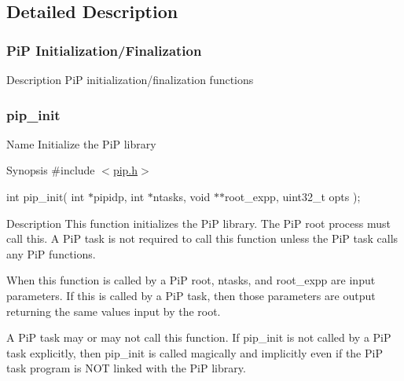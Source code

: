 \subsection{Detailed Description}
\hypertarget{pip-intialize-finalize}{}\subsubsection{Pi\-P Initialization/\-Finalization}\label{pip-intialize-finalize}
\begin{DoxyParagraph}{Description}
Pi\-P initialization/finalization functions 
\end{DoxyParagraph}
\hypertarget{pip_init}{}\subsubsection{pip\-\_\-init}\label{pip_init}
\begin{DoxyParagraph}{Name}
Initialize the Pi\-P library
\end{DoxyParagraph}
\begin{DoxyParagraph}{Synopsis}
\#include $<$\hyperlink{pip_8h_source}{pip.\-h}$>$ \par
int pip\-\_\-init( int $\ast$pipidp, int $\ast$ntasks, void $\ast$$\ast$root\-\_\-expp, uint32\-\_\-t opts );
\end{DoxyParagraph}
\begin{DoxyParagraph}{Description}
This function initializes the Pi\-P library. The Pi\-P root process must call this. A Pi\-P task is not required to call this function unless the Pi\-P task calls any Pi\-P functions. 
\end{DoxyParagraph}
\begin{DoxyParagraph}{}
When this function is called by a Pi\-P root, {\ttfamily ntasks}, and {\ttfamily root\-\_\-expp} are input parameters. If this is called by a Pi\-P task, then those parameters are output returning the same values input by the root. 
\end{DoxyParagraph}
\begin{DoxyParagraph}{}
A Pi\-P task may or may not call this function. If {\ttfamily pip\-\_\-init} is not called by a Pi\-P task explicitly, then {\ttfamily pip\-\_\-init} is called magically and implicitly even if the Pi\-P task program is N\-O\-T linked with the Pi\-P library.
\end{DoxyParagraph}

